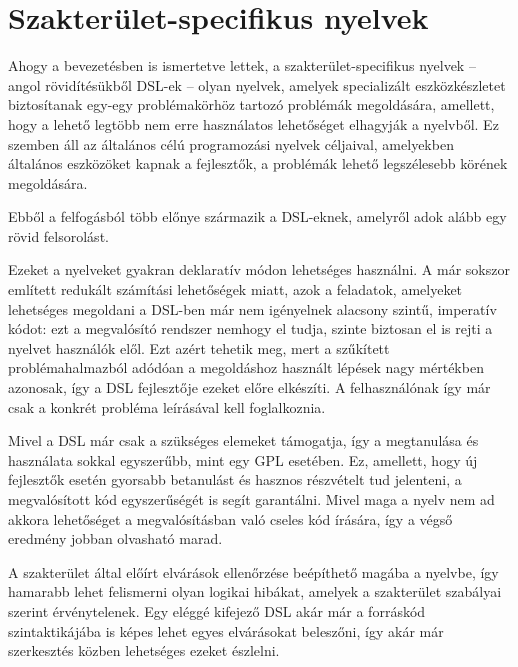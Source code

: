 \chapter{Szakterület-specifikus nyelvek}\label{chr:dsl}

Ahogy a bevezetésben is ismertetve lettek, a szakterület-specifikus nyelvek -- angol rövidítésükből \gls{DSL}-ek -- olyan nyelvek, amelyek specializált eszközkészletet biztosítanak egy-egy problémakörhöz tartozó problémák megoldására, amellett, hogy a lehető legtöbb nem erre használatos lehetőséget elhagyják a nyelvből.
Ez szemben áll az általános célú programozási nyelvek céljaival, amelyekben általános eszközöket kapnak a fejlesztők, a problémák lehető legszélesebb körének megoldására.

Ebből a felfogásból több előnye származik a \gls{DSL}-eknek, amelyről adok alább egy rövid felsorolást.

Ezeket a nyelveket gyakran deklaratív módon lehetséges használni.
A már sokszor említett redukált számítási lehetőségek miatt, azok a feladatok, amelyeket lehetséges megoldani  a \gls{DSL}-ben már nem igényelnek alacsony szintű, imperatív kódot: ezt a megvalósító rendszer nemhogy el tudja, szinte biztosan el is rejti a nyelvet használók elől.
Ezt azért tehetik meg, mert a szűkített problémahalmazból adódóan a megoldáshoz használt lépések nagy mértékben azonosak, így a \gls{DSL}  fejlesztője ezeket előre elkészíti. 
A felhasználónak így már csak a konkrét probléma leírásával kell foglalkoznia.

Mivel a \gls{DSL} már csak a szükséges elemeket támogatja, így a megtanulása és használata sokkal egyszerűbb, mint egy \gls{GPL} esetében.
Ez, amellett, hogy új fejlesztők esetén gyorsabb betanulást és hasznos részvételt tud jelenteni, a megvalósított kód egyszerűségét is segít garantálni.
Mivel maga a nyelv nem ad akkora lehetőséget a megvalósításban való cseles kód írására, így a végső eredmény jobban olvasható marad.

A szakterület által előírt elvárások ellenőrzése beépíthető magába a nyelvbe, így hamarabb lehet felismerni olyan logikai hibákat, amelyek a szakterület szabályai szerint érvénytelenek.
Egy eléggé kifejező \gls{DSL} akár már a forráskód szintaktikájába is képes lehet egyes elvárásokat beleszőni, így akár már szerkesztés közben lehetséges ezeket észlelni.

